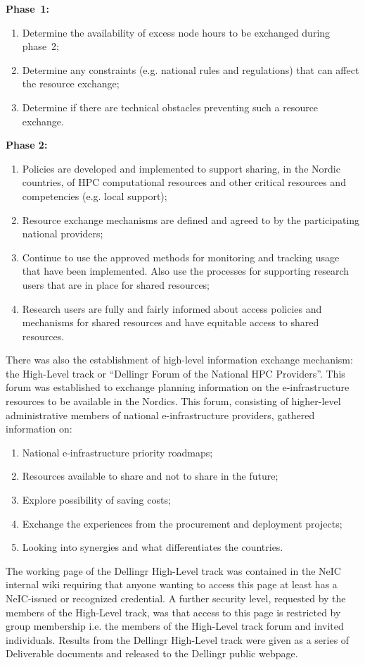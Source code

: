 \documentclass{article}
\newcommand{\dell}{Dellingr\xspace}
\newcommand{\einfra}{e-infrastructure\xspace}
\newcommand{\HLT}{High-Level track\xspace}
\begin{document}
{\bf Phase~1:}
\begin{enumerate}
\item Determine the availability of excess node hours to be exchanged during phase~2;
\item Determine any constraints (e.g. national rules and regulations) that can affect the resource exchange;
\item Determine if there are technical obstacles preventing such a resource exchange.
\end{enumerate}

{\bf Phase 2:}
\begin{enumerate}
\item Policies are developed and implemented to support sharing, in the Nordic countries, of HPC computational resources and other critical resources and competencies (e.g. local support);
\item Resource exchange mechanisms are defined and agreed to by the participating national providers;
\item Continue to use the approved methods for monitoring and tracking usage that have been implemented. Also use the processes for supporting research users that are in place for shared resources;
\item Research users are fully and fairly informed about access policies and mechanisms for shared resources and have equitable 
access to shared resources.
\end{enumerate}

There was also the establishment of high-level information exchange mechanism: the \HLT or ``\dell Forum of the National HPC Providers''.
This forum was established to exchange planning information on the \einfra resources to be available in the Nordics.
This forum, consisting of higher-level administrative members of national \einfra providers, gathered information on:
\begin{enumerate}
\item National \einfra priority roadmaps;
\item Resources available to share and not to share in the future;
\item Explore possibility of saving costs;
\item Exchange the experiences from the procurement and deployment projects;
\item Looking into synergies and what differentiates the countries.
\end{enumerate}
The working page of the \dell \HLT was contained in the NeIC internal wiki requiring that anyone wanting to access this page at least
has a NeIC-issued or recognized credential.
A further security level, requested by the members of the \HLT, was that access to this page is restricted by group membership i.e.
the members of the \HLT forum and invited individuals.
Results from the \dell \HLT were given as a series of Deliverable documents and released to the \dell public webpage.
\end{document}
